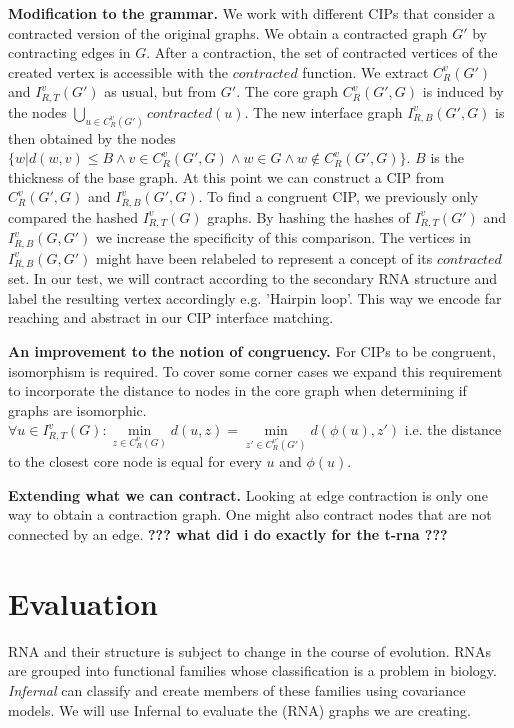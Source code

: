 \documentclass{article}
\begin{document}
\textbf{Modification to the grammar.}
We work with different CIPs that consider a contracted version
of the original graphs. We obtain a contracted graph $G'$ by contracting edges
in $G$. After a contraction, the set of contracted vertices of the 
created vertex is accessible with the $contracted$ function.
We extract $C_{R}^v(G')$ and $I_{R,T}^v(G')$ as usual, but from $G'$. 
The core graph $C_{R}^v(G',G)$ is induced by the nodes 
$\bigcup\limits_{u \in C_R^v(G')} contracted(u)$.
The new interface graph $I_{R,B}^v(G',G)$ is then obtained by the nodes 
$\{ w | d(w,v) \leq B \wedge v\in C_R^v(G',G) \wedge w \in G \wedge w 
\notin C_R^v(G',G) \}$.  $B$ is the thickness of the base graph. 
At this point we can construct a CIP from $C_R^v(G',G)$ and $I_{R,B}^v(G',G)$. 
To find a congruent CIP, we previously only compared the hashed $I_{R,T}^v(G)$ 
graphs. By hashing the hashes of $I_{R,T}^v(G')$ and $I_{R,B}^v(G,G')$ we 
increase the specificity of this comparison. The vertices in $I_{R,B}^v(G,G')$ 
might have been relabeled to represent a concept of its $contracted$ set. In 
our test, we will contract according to the 
secondary RNA structure and label the resulting vertex accordingly e.g.
'Hairpin loop'. This way we encode 
far reaching and abstract in our CIP interface matching.



\textbf{An improvement to the notion of congruency.}
For CIPs to be congruent, isomorphism is required. 
To cover some corner cases we expand this requirement to incorporate
the distance to nodes in the core graph when determining if graphs are 
isomorphic.
$\forall u \in I_{R,T}^v(G) : 
\underset{z \in  C_{R}^v(G)}{\min} d(u,z) = 
\underset{z' \in  C_{R}^{v'}(G')}{\min} d(\phi(u),z') $ i.e. the distance 
to the closest core node is equal for every
$u$ and $\phi(u)$.

\textbf{Extending what we can contract.}
Looking at edge contraction is only one way to obtain a contraction graph. 
One might also contract nodes that are not connected by an edge.
\textbf{??? what did i do exactly for the t-rna ???}

\section{Evaluation}
RNA and their structure is subject to change in the course of evolution.
RNAs are grouped into functional families whose classification
is a problem in biology. \emph{Infernal} can classify and 
create members of these families using covariance models.
We will use Infernal to evaluate the (RNA) graphs we are creating.
\end{document}
